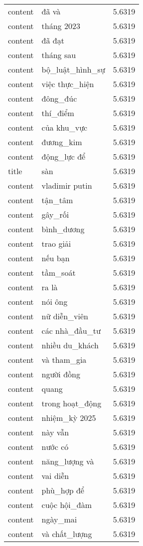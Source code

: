 \documentclass{article}
\begin{document}
\begin{tabular}{lll}
content & đã và & 5.6319\\
content & tháng 2023 & 5.6319\\
content & đã đạt & 5.6319\\
content & tháng sau & 5.6319\\
content & bộ\_luật\_hình\_sự & 5.6319\\
content & việc thực\_hiện & 5.6319\\
content & đông\_đúc & 5.6319\\
content & thí\_điểm & 5.6319\\
content & của khu\_vực & 5.6319\\
content & đương\_kim & 5.6319\\
content & động\_lực để & 5.6319\\
title & sàn & 5.6319\\
content & vladimir putin & 5.6319\\
content & tận\_tâm & 5.6319\\
content & gây\_rối & 5.6319\\
content & bình\_dương & 5.6319\\
content & trao giải & 5.6319\\
content & nếu bạn & 5.6319\\
content & tầm\_soát & 5.6319\\
content & ra là & 5.6319\\
content & nói ông & 5.6319\\
content & nữ diễn\_viên & 5.6319\\
content & các nhà\_đầu\_tư & 5.6319\\
content & nhiều du\_khách & 5.6319\\
content & và tham\_gia & 5.6319\\
content & người đồng & 5.6319\\
content & quang & 5.6319\\
content & trong hoạt\_động & 5.6319\\
content & nhiệm\_kỳ 2025 & 5.6319\\
content & này vẫn & 5.6319\\
content & nước có & 5.6319\\
content & năng\_lượng và & 5.6319\\
content & vai diễn & 5.6319\\
content & phù\_hợp để & 5.6319\\
content & cuộc hội\_đàm & 5.6319\\
content & ngày\_mai & 5.6319\\
content & và chất\_lượng & 5.6319\\

\end{tabular}
\end{document}
